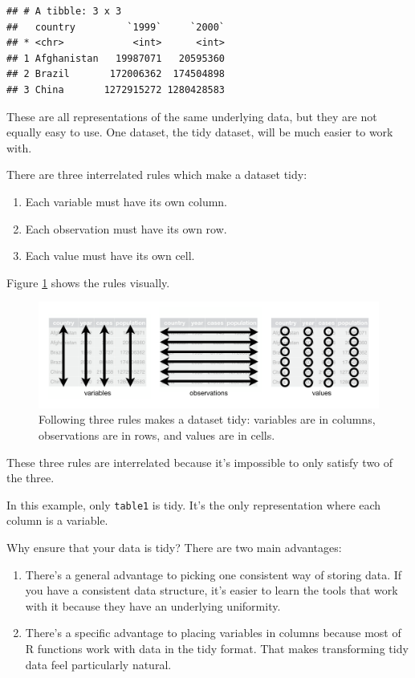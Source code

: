 \documentclass[
]{book}
\providecommand{\tightlist}{%
  \setlength{\itemsep}{0pt}\setlength{\parskip}{0pt}}
\begin{document}
\begin{verbatim}
## # A tibble: 3 x 3
##   country         `1999`     `2000`
## * <chr>            <int>      <int>
## 1 Afghanistan   19987071   20595360
## 2 Brazil       172006362  174504898
## 3 China       1272915272 1280428583
\end{verbatim}

These are all representations of the same underlying data, but they are not equally easy to use. One dataset, the tidy dataset, will be much easier to work with.

There are three interrelated rules which make a dataset tidy:

\begin{enumerate}
\def\labelenumi{\arabic{enumi}.}
\tightlist
\item
  Each variable must have its own column.
\item
  Each observation must have its own row.
\item
  Each value must have its own cell.
\end{enumerate}

Figure \ref{fig:tidy-structure} shows the rules visually.

\begin{figure}
\includegraphics[width=1\linewidth]{images/chapter-5/tidy-1} \caption{Following three rules makes a dataset tidy: variables are in columns, observations are in rows, and values are in cells.}\label{fig:tidy-structure}
\end{figure}

These three rules are interrelated because it's impossible to only satisfy two of the three.

In this example, only \texttt{table1} is tidy. It's the only representation where each column is a variable.

Why ensure that your data is tidy? There are two main advantages:

\begin{enumerate}
\def\labelenumi{\arabic{enumi}.}
\item
  There's a general advantage to picking one consistent way of storing
  data. If you have a consistent data structure, it's easier to learn the
  tools that work with it because they have an underlying uniformity.
\item
  There's a specific advantage to placing variables in columns because
  most of R functions work with data in the tidy format. That makes transforming
  tidy data feel particularly natural.
\end{enumerate}
\end{document}
